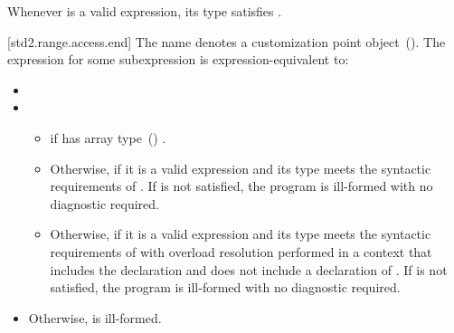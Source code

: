 \pnum
\enternote Whenever  is a valid expression, its
type satisfies . \exitnote

[std2.range.access.end]{}
\pnum
The name  denotes a customization point
object~(). The expression
 for some subexpression  is expression-equivalent to:

\begin{itemize}
\item

\item {}
  \begin{itemize}
  \item
      if  has array
    type~() .

  \item
    Otherwise,  if it is a valid expression and its type  meets the
    syntactic requirements of
    . If
     is not satisfied, the program is ill-formed with
    no diagnostic required.

  \item
    Otherwise,  if it is a valid expression and its type  meets the
    syntactic requirements of
     with overload
    resolution performed in a context that includes the declaration
     and does not include
    a declaration of . If  is not
    satisfied, the program is ill-formed with no diagnostic required.
  \end{itemize}

\item
  Otherwise,  is ill-formed.
\end{itemize}

